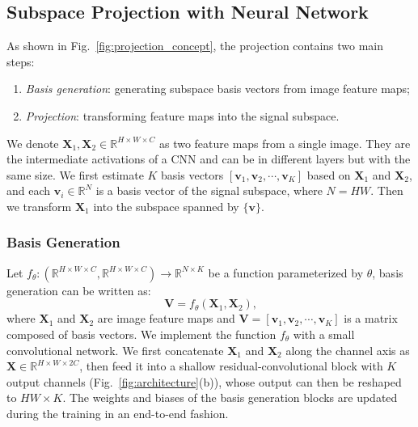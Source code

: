 \documentclass[final]{cvpr}
\newcommand{\bs}{\boldsymbol}
\newcommand{\Xa}{\bs{X}_{1}}
\newcommand{\Xb}{\bs{X}_{2}}
\begin{document}
\subsection{Subspace Projection with Neural Network}

As shown in Fig.~\ref{fig:projection_concept}, the projection contains two main steps:
\begin{enumerate}[label=\alph*),topsep=0pt, partopsep=0pt,itemsep=0pt,parsep=0pt]
	\item \emph{Basis generation}: generating subspace basis vectors from image feature maps;
	\item \emph{Projection}: transforming feature maps into the signal subspace.
\end{enumerate}

We denote $\Xa, \Xb \in \mathbb{R}^{H\times W \times C}$  as two feature maps from a single image. 
They are the intermediate activations of a CNN and can be in different layers but with the same size.
We first estimate $K$ basis vectors
$[\bs{v}_{1},\bs{v}_{2}, \cdots, \bs{v}_{K}]$
based on $\Xa$ and $\Xb$, and each $\bs{v}_{i}\in \mathbb{R}^{N}$ is a basis vector of the signal subspace, where $N=HW$. 
Then we transform $\Xa$ into the subspace spanned by $\{\bs{v}\}$.


\subsubsection{Basis Generation}
Let $f_{\theta}: (\mathbb{R}^{H\times W\times {C}}, \mathbb{R}^{H\times W\times {C}}) \rightarrow \mathbb{R}^{N\times K}$ be a function parameterized by $\theta$, basis generation can be written as:
\begin{equation}
	\bs{V}=f_{\theta}(\Xa, \Xb) \text{,}
	\label{eq: basis_func}
\end{equation}
where  $\Xa$ and $\Xb$ are image feature maps and $\bs{V} = [\bs{v}_{1},\bs{v}_{2}, \cdots, \bs{v}_{K}]$ is a matrix
composed of basis vectors. 
We implement the function $f_\theta$ with a small convolutional network. We first concatenate $\Xa$ and $\Xb$
along the channel axis as $\bs{X} \in \mathbb{R}^{H \times W \times 2C}$, then feed it into a shallow residual-convolutional block with $K$ output channels (Fig.~\ref{fig:architecture}(b)), whose output can then be reshaped to $HW\times K$. The weights and biases of the basis generation blocks are updated during the training in an end-to-end fashion.
\end{document}
